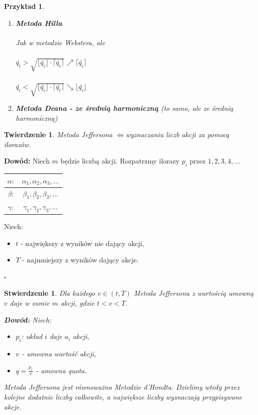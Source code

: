\documentclass[12pt,a4paper]{article}
\newcounter{twierdzenie}
\theoremstyle{break}
\newtheorem{theorem}{Twierdzenie}[section]
\newtheorem{example}{Przykład}[section]
\newtheorem{stwierdzenie}{Stwierdzenie}[section]
\newcommand{\witw}{$\Leftrightarrow$}
\begin{document}
\begin{example}
\begin{enumerate}[1)]
			\item \textbf{Metoda Hilla}\\\\
			Jak w metodzie Webstera, ale\\\\
			$\bar{q_i} > \sqrt{\lfloor \bar{q_i} \rfloor \cdot \lceil \bar{q_i} \rceil} \nearrow \lceil \bar{q_i} \rceil$\\\\
			$\bar{q_i} < \sqrt{\lfloor \bar{q_i} \rfloor \cdot \lceil \bar{q_i} \rceil} \searrow \lfloor \bar{q_i} \rfloor$
			
			\item \textbf{Metoda Deana - ze średnią harmoniczną} (to samo, ale ze średnią harmoniczną)
		\end{enumerate}
	\end{example}
	
	\begin{theorem}
		Metoda Jeffersona \witw wyznaczaniu liczb akcji za pomocą ilorazów.
	\end{theorem}
	
	\noindent \textbf{Dowód:} Niech $m$ będzie liczbą akcji. Rozpatrzmy ilorazy $p_i$ przez $1, 2, 3, 4, \dots$
	
	\begin{tabular}{c|c}
		$\alpha:$ & $\alpha_1, \alpha_2, \alpha_3, \dots$ \\ \hline
		$\beta:$ & $\beta_1, \beta_2, \beta_3, \dots$ \\ \hline
		$\gamma:$ & $\gamma_1, \gamma_2, \gamma_3, \dots$ \\ \hline
	\end{tabular}
	
	Niech:
	\begin{itemize}
		\item $t$ - największy z wyników nie dający akcji,
		\item $T$ - najmniejszy z wyników dający akcje.
	\end{itemize}
	
	\begin{flushright}
		$\square$
	\end{flushright}
	
	\begin{stwierdzenie}
		Dla każdego $v \in (t, T)$ Metoda Jeffersona z wartością umowną $v$ daje w sumie $m$ akcji, gdzie $t < v < T$.
		
		\noindent \textbf{Dowód:} Niech:
		\begin{itemize}
			\item $p_i$: układ $i$ daje $a_i$ akcji,
			\item $v$ - umowna wartość akcji,
			\item $\overset{~}{q} = \frac{p_i}{v}$ - umowna quota.
		\end{itemize}
		
		Metoda Jeffersona jest równoważna Metodzie d'Hondta. Dzielimy wtedy przez kolejne dodatnie liczby całkowite, a największe liczby wyznaczają przypisywane akcje.
	\end{stwierdzenie}
	
\end{document}
